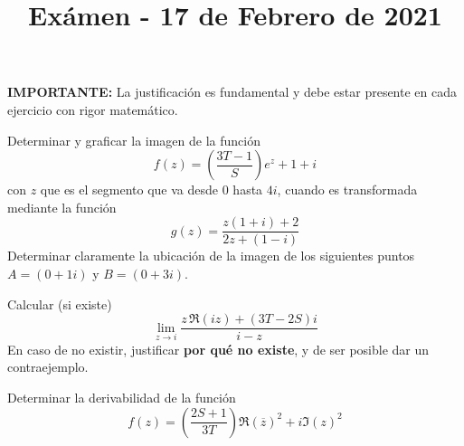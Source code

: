 \documentclass[11pt]{article}
\title{Exámen - 17 de Febrero de 2021}
\begin{document}
 
\let\>=\rangle
\let\<=\langle
\let\pe=\preccurlyeq
\let\minus=\smallsetminus
\let\phi=\varphi
\let\w=\omega
\let\a=\alpha
\let\b=\beta
\def\Z{{\mathbb Z}}
\let\iff=\leftrightarrow
\let\Iff=\Leftrightarrow


\textbf{IMPORTANTE:} La justificación es fundamental y debe estar presente en cada ejercicio con rigor matemático.


\begin{questions}
\question Determinar y graficar la imagen de la función
$$f(z)=\left( \frac{3T-1}{S}\right) e^{z}+1+i$$
 con $z$ que es el segmento que va desde $0$ hasta $4i$, cuando es transformada mediante la función
 $$g(z)=\frac{z(1+i)+2}{2z+(1-i)}$$
 Determinar claramente la ubicación de la imagen de los siguientes puntos $A=(0 + 1i)$ y $B= (0+3i)$.


\question Calcular (si existe)
$$ \lim_{z \to i} \frac{z\,\Re(iz)+ \left( 3T-2S \right)   i}{i-z} $$
En caso de no existir, justificar {\bfseries{ por qué no existe}}, y de ser posible dar un contraejemplo.

\question Determinar la derivabilidad de la función
$$f(z)= \left( \frac{2S+1}{3T} \right)   \mathrm{\Re }(\overline{z})^2 +i \mathrm{\Im }(z)^2$$
  


\end{questions}
\end{document}
